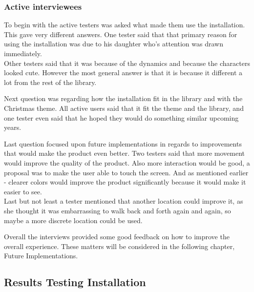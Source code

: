 
\subsubsection{Active interviewees}
To begin with the active testers was asked what made them use the installation. This gave very different answers. One tester said that that primary reason for using the installation was due to his daughter who's attention was drawn immediately.\\
Other testers said that it was because of the dynamics and because the characters looked cute. However the most general answer is that it is because it different a lot from the rest of the library.

Next question was regarding how the installation fit in the library and with the Christmas theme. All active users said that it fit the theme and the library, and one tester even said that he hoped they would do something similar upcoming years.

Last question focused upon future implementations in regards to improvements that would make the product even better. Two testers said that more movement would improve the quality of the product. Also more interaction would be good, a proposal was to make the user able to touch the screen.
And as mentioned earlier - clearer colors would improve the product significantly because it would make it easier to see.\\
Last but not least a tester mentioned that another location could improve it, as she thought it was embarrassing to walk back and forth again and again, so maybe a more discrete location could be used.

Overall the interviews provided some good feedback on how to improve the overall experience. These matters will be considered in the following chapter, Future Implementations.

\subsection{Results Testing Installation}

